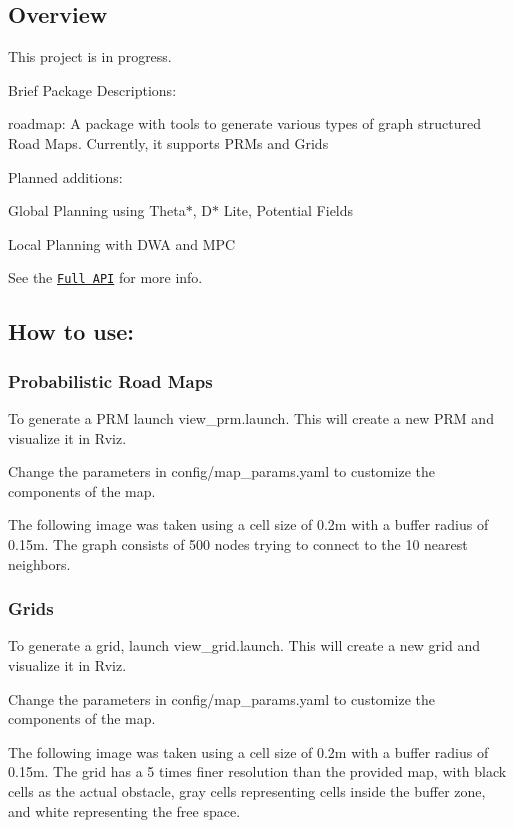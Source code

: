 \subsection*{Overview}

This project is in progress.

Brief Package Descriptions\+:
\begin{DoxyItemize}
\item {\ttfamily roadmap}\+: A package with tools to generate various types of graph structured Road Maps. Currently, it supports P\+R\+Ms and Grids
\end{DoxyItemize}

Planned additions\+:
\begin{DoxyItemize}
\item Global Planning using Theta$\ast$, D$\ast$ Lite, Potential Fields
\item Local Planning with D\+WA and M\+PC
\end{DoxyItemize}

See the \href{https://rencheckyoself.github.io/motion-planning-in-ROS/}{\tt Full A\+PI} for more info.

\subsection*{How to use\+:}

\subsubsection*{Probabilistic Road Maps}

To generate a P\+RM launch {\ttfamily view\+\_\+prm.\+launch}. This will create a new P\+RM and visualize it in Rviz.

Change the parameters in {\ttfamily config/map\+\_\+params.\+yaml} to customize the components of the map.

The following image was taken using a cell size of 0.\+2m with a buffer radius of 0.\+15m. The graph consists of 500 nodes trying to connect to the 10 nearest neighbors.  \subsubsection*{Grids}

To generate a grid, launch {\ttfamily view\+\_\+grid.\+launch}. This will create a new grid and visualize it in Rviz.

Change the parameters in {\ttfamily config/map\+\_\+params.\+yaml} to customize the components of the map.

The following image was taken using a cell size of 0.\+2m with a buffer radius of 0.\+15m. The grid has a 5 times finer resolution than the provided map, with black cells as the actual obstacle, gray cells representing cells inside the buffer zone, and white representing the free space.

